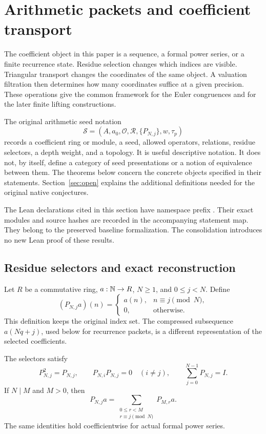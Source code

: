 \section{Arithmetic packets and coefficient transport}
\label{sec:foundations}

The coefficient object in this paper is a sequence, a formal power series, or a
finite recurrence state. Residue selection changes which indices are visible.
Triangular transport changes the coordinates of the same object. A valuation
filtration then determines how many coordinates suffice at a given precision.
These operations give the common framework for the Euler congruences and for
the later finite lifting constructions.

The original arithmetic seed notation
\[
\mathcal S=(A,a_0,\mathcal O,\mathcal R,\{P_{N,j}\},w,\tau_p)
\]
records a coefficient ring or module, a seed, allowed operators, relations,
residue selectors, a depth weight, and a topology. It is useful descriptive
notation. It does not, by itself, define a category of seed presentations or a
notion of equivalence between them. The theorems below concern the concrete
objects specified in their statements. Section~\ref{sec:open} explains the
additional definitions needed for the original native conjectures.

The Lean declarations cited in this section have namespace prefix
. Their exact modules and source hashes are recorded in
the accompanying statement map. They belong to the preserved baseline
formalization. The consolidation introduces no new Lean proof of these results.

\subsection{Residue selectors and exact reconstruction}

Let $R$ be a commutative ring, $a:\mathbb N\to R$, $N\geq1$, and $0\leq j<N$.
Define
\[
(P_{N,j}a)(n)=
\begin{cases}
a(n),&n\equiv j\pmod N,\\
0,&\text{otherwise}.
\end{cases}
\]
This definition keeps the original index set. The compressed subsequence
$a(Nq+j)$, used below for recurrence packets, is a different representation of
the selected coefficients.

\begin{theorem}
\label{thm:residue-reconstruction}
The selectors satisfy
\[
P_{N,j}^2=P_{N,j},\qquad P_{N,i}P_{N,j}=0\quad(i\ne j),
\qquad \sum_{j=0}^{N-1}P_{N,j}=I.
\]
If $N\mid M$ and $M>0$, then
\[
P_{N,j}a=\sum_{\substack{0\leq r<M\\r\equiv j\pmod N}}P_{M,r}a.
\]
The same identities hold coefficientwise for actual formal power series.
\end{theorem}

